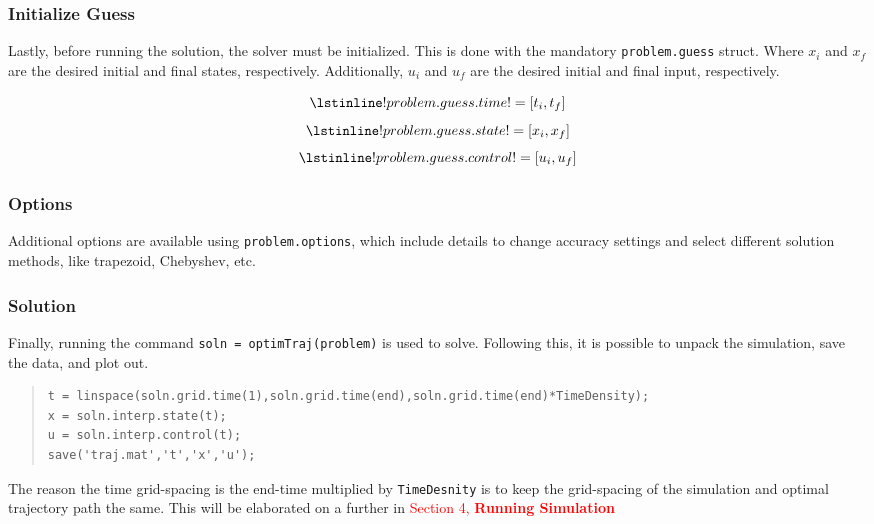 \documentclass[12pt]{article}
\begin{document}
\subsubsection{Initialize Guess}
Lastly, before running the solution, the solver must be initialized. This is done with the mandatory \lstinline!problem.guess! struct. Where $x_{i}$ and $x_{f}$ are the desired initial and final states, respectively. Additionally, $u_{i}$ and $u_{f}$ are the desired initial and final input, respectively. 

\begin{figure}[H]
\begin{equation*}
\lstinline!problem.guess.time! = [t_{i}, t_{f}]
\end{equation*}
\begin{equation*}
\lstinline!problem.guess.state! = [x_{i}, x_{f}]
\end{equation*}
\begin{equation*}
\lstinline!problem.guess.control! = [u_{i}, u_{f}] 
\end{equation*}
\end{figure}
\subsubsection{Options}
Additional options are available using \lstinline!problem.options!, which include details to change accuracy settings and select different solution methods, like trapezoid, Chebyshev, etc.
\subsubsection{Solution}
Finally, running the command \lstinline!soln = optimTraj(problem)! is used to solve. Following this, it is possible to unpack the simulation, save the data, and plot out.
\begin{quote}
\begin{lstlisting}
t = linspace(soln.grid.time(1),soln.grid.time(end),soln.grid.time(end)*TimeDensity);
x = soln.interp.state(t);
u = soln.interp.control(t);
save('traj.mat','t','x','u');
\end{lstlisting}
\end{quote}

The reason the time grid-spacing is the end-time multiplied by \lstinline!TimeDesnity! is to keep the grid-spacing of the simulation and optimal trajectory path the same. This will be elaborated on a further in \textcolor{red}{Section 4, \textbf{Running Simulation}}
\end{document}
